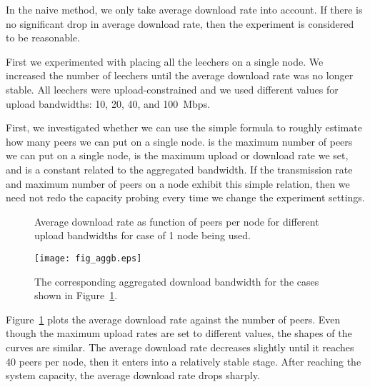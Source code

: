 \documentclass[10pt,letterpaper,twocolumn]{article}
\begin{document}
In the naive method, we only take average download rate into
account. If there is no significant drop in average download rate,
then the experiment is considered to be reasonable.

First we experimented with placing all the leechers on a single
node. We increased the number of leechers until the average download
rate was no longer stable. All leechers were upload-constrained and we
used different values for upload bandwidths: 10, 20, 40, and
100~Mbps.



First, we investigated whether we can use the simple formula
 to roughly estimate how many peers we can put on a
single node.  is the maximum number of peers we can put on a single
node,  is the maximum upload or download rate we set, and  is a
constant related to the aggregated bandwidth. If the transmission rate
and maximum number of peers on a node exhibit this simple relation,
then we need not redo the capacity probing every time we change the
experiment settings.

\begin{figure}[!tb] 
\centering 
{} 

\caption{Average download rate as function of peers per node for
  different upload bandwidths for case of 1 node being used.}
\label{cap_1} 
\end{figure}


\begin{figure}[!tb]
\begin{center}
\texttt{[image: fig\_aggb.eps]}
\caption{The corresponding aggregated download bandwidth for the cases
  shown in Figure~\ref{cap_1}.}
\label{cap_2}
\end{center}
\end{figure}

Figure~\ref{cap_1} plots the average download rate against the number
of peers. Even though the maximum upload rates are set to different
values, the shapes of the curves are similar. The average download
rate decreases slightly until it reaches 40 peers per node, then it
enters into a relatively stable stage. After reaching the system
capacity, the average download rate drops sharply.
\end{document}
